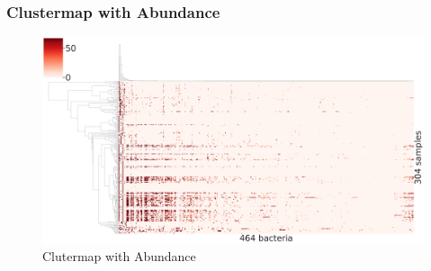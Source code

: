 \documentclass{beamer}
\begin{document}
    \begin{frame}
        \frametitle{Clustermap with Abundance}

        \begin{figure}
            \includegraphics[width=0.8 \linewidth]{figures/Step55/everything.DADA2.homd.uncorrected.pdf}
            \caption{Clutermap with Abundance}
        \end{figure}
    \end{frame}
\end{document}
